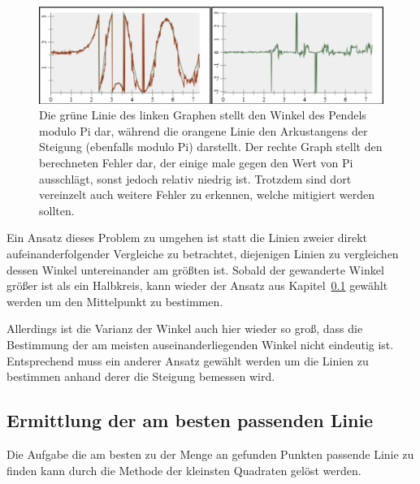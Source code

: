 \begin{figure}[htb]
	\includegraphics[width=\textwidth]{gfx/max_abstand_steigung differenz.png}
	\caption{Die grüne Linie des linken Graphen stellt den Winkel des Pendels modulo Pi dar, während die orangene Linie  den Arkustangens der Steigung (ebenfalls modulo Pi) darstellt. Der rechte Graph stellt den berechneten Fehler dar, der einige male gegen den Wert von Pi ausschlägt, sonst jedoch relativ niedrig ist. Trotzdem sind dort vereinzelt auch weitere Fehler zu erkennen, welche mitigiert werden sollten.}
	\label{fig:max_abstand_steigung differenz}
\end{figure}

Ein Ansatz dieses Problem zu umgehen ist statt die Linien zweier direkt aufeinanderfolgender Vergleiche zu betrachtet, diejenigen Linien zu vergleichen dessen Winkel untereinander am größten ist.
Sobald der gewanderte Winkel größer ist als ein Halbkreis, kann wieder der Ansatz aus Kapitel~\ref{} %
gewählt werden um den Mittelpunkt zu bestimmen.

Allerdings ist die Varianz der Winkel auch hier wieder so groß, dass die Bestimmung der am meisten auseinanderliegenden Winkel nicht eindeutig ist.
Entsprechend muss ein anderer Ansatz gewählt werden um die Linien zu bestimmen anhand derer die Steigung bemessen wird.

\subsection{Ermittlung der am besten passenden Linie}

Die Aufgabe die am besten zu der Menge an gefunden Punkten passende Linie zu finden kann durch die Methode der kleinsten Quadraten gelöst werden.

